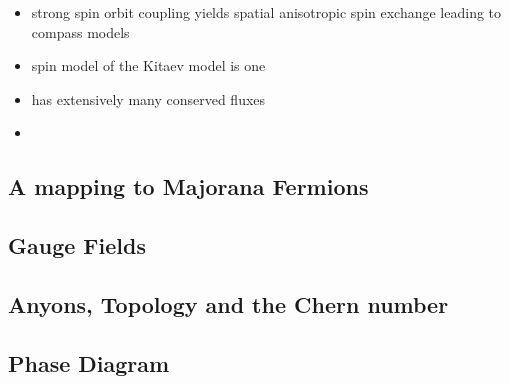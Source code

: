 \begin{itemize}
\tightlist
\item
  strong spin orbit coupling yields spatial anisotropic spin exchange leading to compass models \autocite{kugelJahnTellerEffectMagnetism1982}
\item
  spin model of the Kitaev model is one
\item
  has extensively many conserved fluxes
\item
\end{itemize}

\hypertarget{a-mapping-to-majorana-fermions}{%
\subsection{A mapping to Majorana Fermions}\label{a-mapping-to-majorana-fermions}}

\hypertarget{gauge-fields}{%
\subsection{Gauge Fields}\label{gauge-fields}}

\hypertarget{anyons-topology-and-the-chern-number}{%
\subsection{Anyons, Topology and the Chern number}\label{anyons-topology-and-the-chern-number}}

\hypertarget{phase-diagram}{%
\subsection{Phase Diagram}\label{phase-diagram}}

\begin{Shaded}
\begin{Highlighting}[]

\end{Highlighting}
\end{Shaded}
